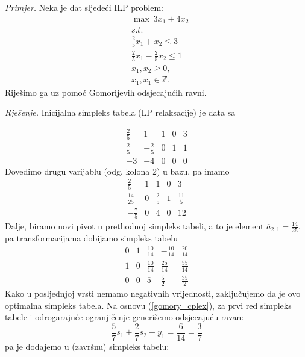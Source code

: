 \documentclass[a4paper, utf8, 11pt, colorlinks]{book}
\begin{document}
\emph{{Primjer.}} Neka je dat sljedeći ILP problem:\\
$$\begin{array}{ll}
    &\max\ 3 x_1 + 4 x_2 \\
    & {s.t. }  \\
    & \displaystyle\frac{2}{5}x_1 + x_2 \leq 3 \\
    & \displaystyle\frac{2}{5}x_1 - \frac{2}{5}x_2 \leq 1 \\
    &x_1, x_2 \geq 0, \\
    &  x_1, x_1 \in \mathbb{Z}.
\end{array}$$
Riješimo ga uz pomoć Gomorijevih odsjecajućih ravni. 

\emph{Rješenje.}
Inicijalna simpleks tabela (LP relaksacije) je data sa 

$$\begin{array}{cccc|c}
   \frac{2}{5}           & 1               & 1 & 0 & 3 \\
   \frac{2}{5}           & -\frac{2}{5}    & 0 & 1 & 1 \\ \hline
   -3                    &  -4             & 0 & 0 & 0
\end{array}$$
Dovedimo drugu varijablu (odg. kolona 2) u bazu, pa imamo 
$$\begin{array}{cccc|c}
   \frac{2}{5}           & 1               & 1           & 0 & 3 \\
   \frac{14}{25}         & 0               & \frac{2}{5} & 1 & \frac{11}{5}\\ \hline
   -\frac{7}{5}                  & 0               &4 & 0 & 12
\end{array}$$
Dalje, biramo novi pivot  u prethodnoj simpleks tabeli, a to je element $\overline{a}_{2,1} = \frac{14}{25}$, pa transformacijama dobijamo simpleks tabelu
$$
\begin{array}{cccc|c}
    0    &  1  &  \frac{10}{14} &  -\frac{10}{14}  &  \frac{20}{14}                  \\
    1    &  0  &  \frac{10}{14} &   \frac{25}{14}  &   \frac{55}{14}\\ \hline
    0    &  0  &  5             &    \frac{5}{2}   &    \frac{35}{2}
\end{array}
$$
Kako u posljednjoj vrsti nemamo negativnih vrijednosti, zaključujemo da je ovo optimalna simpleks tabela. Na osnovu (\ref{gomory_cplex}),   za prvi red simpleks tabele i odrogarajuće ogranjičenje generišemo odsjecajuću ravan:
$$   \frac{5}{7}s_1 + \frac{2}{7} s_2 -      y_1   = \frac{6}{14}=\frac{3}{7}$$
pa je dodajemo u (završnu) simpleks tabelu:
\end{document}
